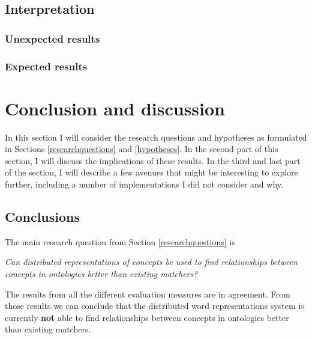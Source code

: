 \documentclass{article}
\begin{document}
 \newpage
 \subsection{Interpretation}
 \subsubsection{Unexpected results}
 \subsubsection{Expected results}
  
 \newpage
 \section{Conclusion and discussion}
 In this section I will consider the research questions and hypotheses as formulated in Sections \ref{researchquestions} and \ref{hypotheses}. In the second part of this section, I will discuss the implications of these results. In the third and last part of the section, I will describe a few avenues that might be interesting to explore further, including a number of implementations I did not consider and why.
 
 \subsection{Conclusions} \label{conclusions}
 The main research question from Section \ref{researchquestions} is
 \begin{center}
 \textit{
 Can distributed representations of concepts be used to find relationships between concepts in ontologies better than existing matchers?
 }
 \end{center}
 
 The results from all the different evaluation measures are in agreement. From those results we can conclude that the distributed word representations system is currently \textbf{not} able to find relationships between concepts in ontologies better than existing matchers.
\end{document}

